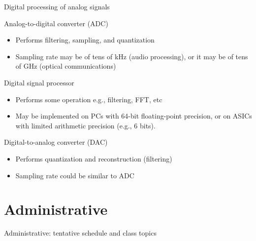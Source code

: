 \documentclass[10pt, aspectratio=169]{beamer}
\begin{document}
\begin{frame}{Digital processing of analog signals}
	\vspace{-0.1cm}
	\begin{figure}[t!]
		\centering
		\resizebox{0.7\linewidth}{!}{}
		\label{fig:adc-dsp-dac}
	\end{figure}
	\vspace{-0.3cm}
	\begin{block}{Analog-to-digital converter (ADC)}
		\begin{itemize}
			\item Performs filtering, sampling, and quantization
			\item Sampling rate may be of tens of kHz (audio processing), or it may be of tens of GHz (optical communications)
		\end{itemize}
	\end{block}
	\vspace{-0.3cm}
	\begin{block}{Digital signal processor}
		\begin{itemize} \itemsep 0pt
			\item Performs some operation e.g., filtering, FFT, etc
			\item May be implemented on PCs with 64-bit floating-point precision, or on ASICs with limited arithmetic precision (e.g., 6 bits).
		\end{itemize}
	\end{block}
	\vspace{-0.3cm}
	\begin{block}{Digital-to-analog converter (DAC)}
		\begin{itemize}
			\item Performs quantization and reconstruction (filtering)
			\item Sampling rate could be similar to ADC
		\end{itemize}
	\end{block}
\end{frame}

\section{Administrative}

%
\begin{frame}{Administrative: tentative schedule and class topics}

\centering
\resizebox{\linewidth}{!}{}

\end{frame}
\end{document}

